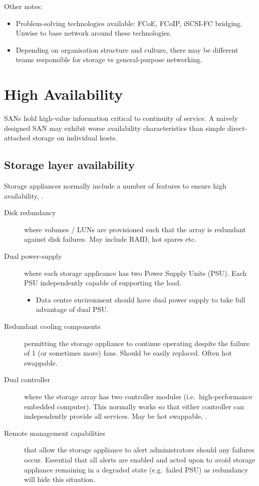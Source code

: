 Other notes:

\begin{itemize}
\item
  Problem-solving technologies available: FCoE, FCoIP, iSCSI-FC
  bridging. Unwise to base network around these technologies.
\item
  Depending on organisation structure and culture, there may be
  different teams responsible for storage vs general-purpose networking.
\end{itemize}

\section{High Availability}\label{high-availability}

SANs hold high-value information critical to continuity of service. A
naively designed SAN may exhibit worse availability characteristics than
simple direct-attached storage on individual hosts.

\subsection{Storage layer
availability}\label{storage-layer-availability}

Storage appliances normally include a number of features to ensure high
availability, .

\begin{description}
\item[Disk redundancy]
where volumes / LUNs are provisioned such that the array is redundant
against disk failures. May include RAID, hot spares etc.
\item[Dual power-supply]
where each storage applicance has two Power Supply Units (PSU). Each PSU
independently capable of supporting the load.

\begin{itemize}

\item
  Data centre environment should have dual power supply to take full
  advantage of dual PSU.
\end{itemize}
\item[Redundant cooling components]
permitting the storage appliance to continue operating despite the
failure of 1 (or sometimes more) fans. Should be easily replaced. Often
hot swappable.
\item[Dual controller]
where the storage array has two controller modules
(i.e.~high-performance embedded computer). This normally works so that
either controller can independently provide all services. May be hot
swappable, .
\item[Remote management capabilities]
that allow the storage appliance to alert administrators should any
failures occur. Essential that all alerts are enabled and acted upon to
avoid storage appliance remaining in a degraded state (e.g.~failed PSU)
as redundancy will hide this situation.
\end{description}

